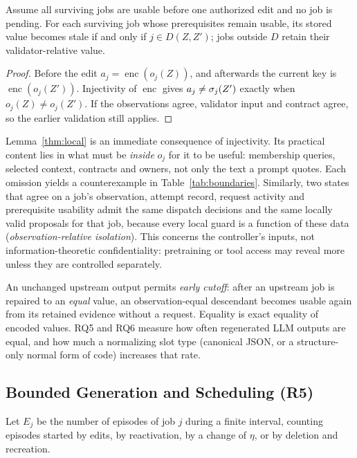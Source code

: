 \begin{lemma}\label{thm:local}
Assume all surviving jobs are usable before one authorized edit and no job is pending. For each surviving job whose prerequisites remain usable, its stored value becomes stale if and only if $j\in D(Z,Z')$; jobs outside $D$ retain their validator-relative value.
\end{lemma}
\begin{proof}
Before the edit $a_j=\operatorname{enc}(o_j(Z))$, and afterwards the current key is $\operatorname{enc}(o_j(Z'))$. Injectivity of $\operatorname{enc}$ gives $a_j\ne\sigma_j(Z')$ exactly when $o_j(Z)\ne o_j(Z')$. If the observations agree, validator input and contract agree, so the earlier validation still applies.
\end{proof}

Lemma~\ref{thm:local} is an immediate consequence of injectivity. Its practical content lies in what must be \emph{inside} $o_j$ for it to be useful: membership queries, selected context, contracts and owners, not only the text a prompt quotes. Each omission yields a counterexample in Table~\ref{tab:boundaries}. Similarly, two states that agree on a job's observation, attempt record, request activity and prerequisite usability admit the same dispatch decisions and the same locally valid proposals for that job, because every local guard is a function of these data (\emph{observation-relative isolation}). This concerns the controller's inputs, not information-theoretic confidentiality: pretraining or tool access may reveal more unless they are controlled separately.

An unchanged upstream output permits \emph{early cutoff}: after an upstream job is repaired to an \emph{equal} value, an observation-equal descendant becomes usable again from its retained evidence without a request. Equality is exact equality of encoded values. RQ5 and RQ6 measure how often regenerated LLM outputs are equal, and how much a normalizing slot type (canonical JSON, or a structure-only normal form of code) increases that rate.

\subsection{Bounded Generation and Scheduling (R5)}
Let $E_j$ be the number of episodes of job $j$ during a finite interval, counting episodes started by edits, by reactivation, by a change of $\eta$, or by deletion and recreation.

